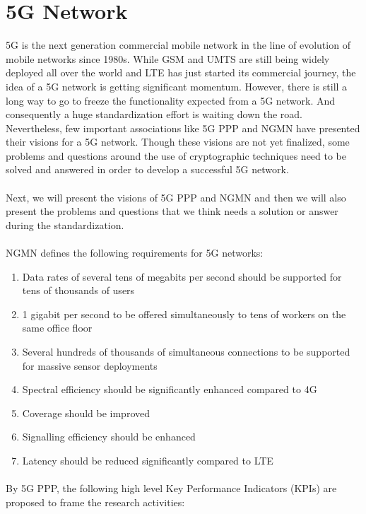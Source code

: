 \documentclass[14pt]{article}
\begin{document}
\section*{5G Network} 5G is the next generation commercial mobile network in the line of evolution of mobile networks since 1980s. While GSM and UMTS are still being widely deployed all over the world and LTE has just started its commercial journey, the idea of a 5G network is getting significant momentum. However, there is still a long way to go to freeze the functionality expected from a 5G network. And consequently a huge standardization effort is waiting down the road. Nevertheless, few important associations like 5G PPP and NGMN have presented their visions for a 5G network. Though these visions are not yet finalized, some problems and questions around the use of cryptographic techniques need to be solved and answered in order to develop a successful 5G network. \paragraph{} Next, we will present the visions of 5G PPP and NGMN and then we will also present the problems and questions that we think needs a solution or answer during the standardization. \paragraph*{} NGMN defines the following requirements for 5G networks:
\begin{enumerate}
\item Data rates of several tens of megabits per second should be supported for tens of thousands of users
\item 1 gigabit per second to be offered simultaneously to tens of workers on the same office floor
\item Several hundreds of thousands of simultaneous connections to be supported for massive sensor deployments
\item Spectral efficiency should be significantly enhanced compared to 4G
\item Coverage should be improved
\item Signalling efficiency should be enhanced
\item Latency should be reduced significantly compared to LTE
\end{enumerate} \paragraph*{} By 5G PPP, the following high level Key Performance Indicators (KPIs) are proposed to frame the research activities:
\end{document}
